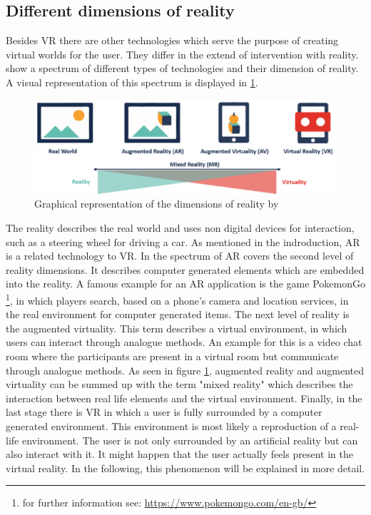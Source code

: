\subsection{Different dimensions of reality}
\label{dimensions-reality}
Besides VR there are other technologies which serve the purpose of creating virtual worlds for the user. They differ in the extend of intervention with reality. \cite{Tham.2018} show a spectrum of different types of technologies and their dimension of reality. A visual representation of this spectrum is displayed in \ref{fig:spectrum}.\\
\begin{figure}[h!]
  \includegraphics[width=14cm]{kapitel/eps/spectrum-of-reality.pdf}
  \centering
  \caption{Graphical representation of the dimensions of reality by 	  \cite{Lovreglio.2018}}
  \label{fig:spectrum}
\end{figure}

The reality describes the real world and uses non digital devices for interaction, such as a steering wheel for driving a car. As mentioned in the indroduction, AR is a related technology to VR. In the spectrum of \cite{Tham.2018} AR covers the second level of reality dimensions. It describes computer generated elements which are embedded into the reality. A famous example for an AR application is the game PokemonGo \footnote{\label{foot:1} for further information see: \url{https://www.pokemongo.com/en-gb/}}, in which players search, based on a phone's camera and location services, in the real environment for computer generated items. The next level of reality is the augmented virtuality. This term describes a virtual environment, in which users can interact through analogue methods. An example for this is a video chat room where the participants are present in a virtual room but communicate through analogue methods. As seen in figure \ref{fig:spectrum}, augmented reality and augmented virtuality can be summed up with the term "mixed reality" which describes the interaction between real life elements and the virtual environment. Finally, in the last stage there is VR in which a user is fully surrounded by a computer generated environment. This environment is most likely a reproduction of a real-life environment. The user is not only surrounded by an artificial reality but can also interact with it. It might happen that the user actually feels present in the virtual reality. In the following, this phenomenon will be explained in more detail.

